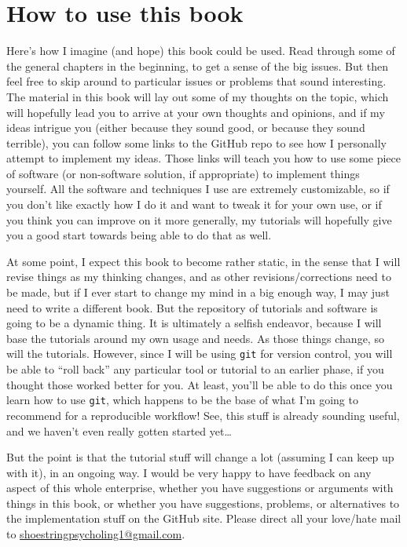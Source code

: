 \documentclass{book}
\begin{document}
\section{How to use this book}
\label{sec-1-3}

Here's how I imagine (and hope) this book could be used.  Read through some of the general chapters in the beginning, to get a sense of the big issues.  But then feel free to skip around to particular issues or problems that sound interesting.  The material in this book will lay out some of my thoughts on the topic, which will hopefully lead you to arrive at your own thoughts and opinions, and if my ideas intrigue you (either because they sound good, or because they sound terrible), you can follow some links to the GitHub repo to see how I personally attempt to implement my ideas. Those links will teach you how to use some piece of software (or non-software solution, if appropriate) to implement things yourself.  All the software and techniques I use are extremely customizable, so if you don't like exactly how I do it and want to tweak it for your own use, or if you think you can improve on it more generally, my tutorials will hopefully give you a good start towards being able to do that as well.

At some point, I expect this book to become rather static, in the sense that I will revise things as my thinking changes, and as other revisions/corrections need to be made, but if I ever start to change my mind in a big enough way, I may just need to write a different book.  But the repository of tutorials and software is going to be a dynamic thing.  It is ultimately a selfish endeavor, because I will base the tutorials around my own usage and needs.  As those things change, so will the tutorials.  However, since I will be using \texttt{git} for version control, you will be able to ``roll back'' any particular tool or tutorial to an earlier phase, if you thought those worked better for you. At least, you'll be able to do this once you learn how to use \texttt{git}, which happens to be the base of what I'm going to recommend for a reproducible workflow! See, this stuff is already sounding useful, and we haven't even really gotten started yet\ldots{}

But the point is that the tutorial stuff will change a lot (assuming I can keep up with it), in an ongoing way.  I would be very happy to have feedback on any aspect of this whole enterprise, whether you have suggestions or arguments with things in this book, or whether you have suggestions, problems, or alternatives to the implementation stuff on the GitHub site.  Please direct all your love/hate mail to \href{mailto:shoestringpsycholing1@gmail.com}{shoestringpsycholing1@gmail.com}.
\end{document}
